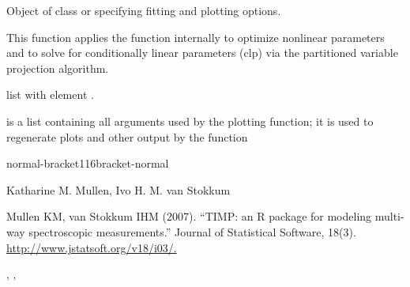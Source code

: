 \begin{Arguments}
\begin{ldescription}
{}

\item[\code{opt}] Object of class  or  specifying 
fitting and plotting options. 
\end{ldescription}
\end{Arguments}
\begin{Details}\relax
This function applies the  function internally to 
optimize nonlinear parameters and to solve for conditionally linear parameters
(clp) via the partitioned variable projection algorithm.
\end{Details}
\begin{Value}
list with element .  
\begin{ldescription}
\item[\code{toPlotter}] is a list containing all arguments used by the plotting 
function; it is used to regenerate plots and other output by the 
  function
\end{ldescription}

normal-bracket116bracket-normal
\end{Value}
\begin{Author}\relax
Katharine M. Mullen, Ivo H. M. van Stokkum
\end{Author}
\begin{References}\relax
Mullen KM, van Stokkum IHM (2007). 
``TIMP: an R package for modeling
multi-way spectroscopic measurements.'' Journal of Statistical Software,
18(3). \url{http://www.jstatsoft.org/v18/i03/.}
\end{References}
\begin{SeeAlso}\relax
{}, , 
\end{SeeAlso}

